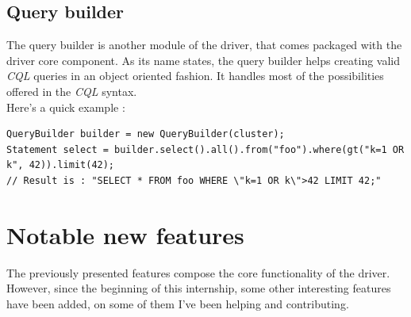 \documentclass[a4paper]{report}
\begin{document}
\subsection{Query builder}
The query builder is another module of the driver, that comes packaged with the driver core component. As its name states, the query builder helps creating valid \emph{CQL} queries in an object oriented fashion. It handles most of the possibilities offered in the \emph{CQL} syntax.\\
Here's a quick example : 
\begin{lstlisting}[label=qb-ex-1, caption=Query Builder example, style=Java]
QueryBuilder builder = new QueryBuilder(cluster);
Statement select = builder.select().all().from("foo").where(gt("k=1 OR k", 42)).limit(42);
// Result is : "SELECT * FROM foo WHERE \"k=1 OR k\">42 LIMIT 42;"
\end{lstlisting}



\section{Notable new features}
The previously presented features compose the core functionality of the driver. However, since the beginning of this internship, some other interesting features have been added, on some of them I've been helping and contributing.
\end{document}
